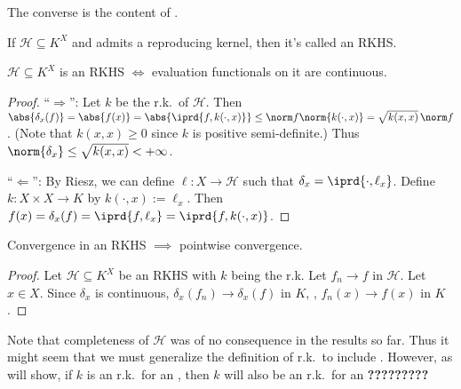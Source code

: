 	\begin{rmk}
		The converse is the content of .
	\end{rmk}
	
	
	
	\begin{dfn}
		If $\mathscr H\subseteq K^X$ and admits a reproducing kernel, then it's called an RKHS.
	\end{dfn}
	
	
	\begin{cor}
		$\mathscr H\subseteq K^X$ is an RKHS $\iff$ evaluation functionals on it are continuous.
	\end{cor}
	
	\begin{proof}
		``$\Rightarrow$'': Let $k$ be the r.k.\ of $\mathscr H$. Then $\abs{\delta_x(f)} = \abs{f(x)} = \abs{\iprd{f, k(\cdot, x)}}\le \norm f\norm{k(\cdot, x)} = \sqrt{k(x, x)}\,\norm f$. (Note that $k(x, x)\ge 0$ since $k$ is positive semi-definite.) Thus $\norm{\delta_x}\le \sqrt{k(x, x)} < +\infty$.
		
		``$\Leftarrow$'': By Riesz, we can define $\ell\colon X\to\mathscr H$ such that $\delta_x = \iprd{\cdot, \ell_x}$. Define $k\colon X\times X\to K$ by $k(\cdot, x) := \ell_x$. Then $f(x) = \delta_x(f) = \iprd{f, \ell_x} = \iprd{f, k(\cdot, x)}$.
	\end{proof}
	
	
	
	\begin{cor}
		Convergence in an RKHS $\implies$ pointwise convergence.
	\end{cor}
	
	\begin{proof}
		Let $\mathscr H\subseteq K^X$ be an RKHS with $k$ being the r.k. Let $f_n\to f$ in $\mathscr H$. Let $x\in X$. Since $\delta_x$ is continuous, $\delta_x(f_n)\to \delta_x(f)$ in $K$, \ie, $f_n(x)\to f(x)$ in $K$.
	\end{proof}
	
	
	\begin{rmk}
		Note that completeness of $\mathscr H$ was of no consequence in the results so far. Thus it might seem that we must generalize the definition of r.k.\ to include . However, as  will show, if $k$ is an r.k.\ for an \IPS, then $k$ will also be an r.k.\ for an \textbf{?????????}
	\end{rmk}
	
	
	
